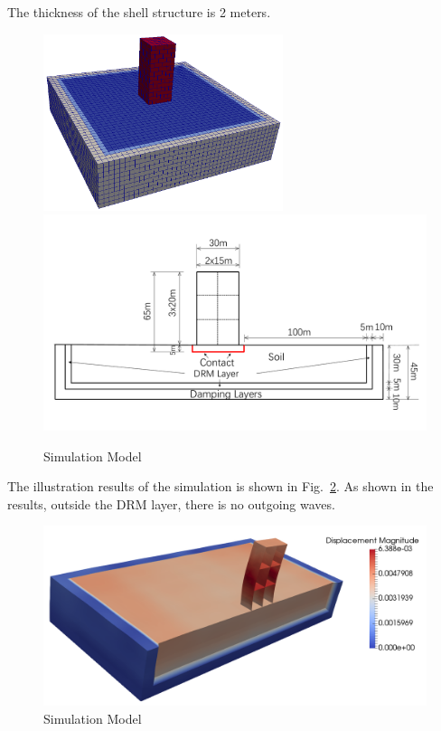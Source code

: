 The thickness of the shell structure is 2 meters.

\begin{figure}[H]
  \centering
  \includegraphics[width = 7cm]{./Figure-files/nonlinear_analysis_steps/soil-structure/overview.png}
  \includegraphics[width = 14cm]{./Figure-files/nonlinear_analysis_steps/soil-structure/geometry.pdf}
  \caption{Simulation Model}
  \label{fig_decon_1D_motion_3D_model}
\end{figure}


The illustration results of the simulation is shown in Fig.~\ref{fig_decon_3D_motion_3D_model_results_structure}.
As shown in the results, outside the DRM layer, there is no outgoing waves. 

\begin{figure}[H]
  \centering
  \includegraphics[width = 12cm]{./Figure-files/nonlinear_analysis_steps/soil-structure/DRM3D_motion3D_structure.png}
  \caption{Simulation Model}
  \label{fig_decon_3D_motion_3D_model_results_structure}
\end{figure}

